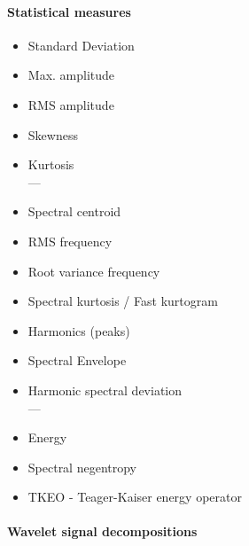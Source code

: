 \cite{jung_vibration_2017}

\paragraph{Statistical measures}
\begin{itemize}
\item Standard Deviation
\item Max. amplitude
\item RMS amplitude
\item Skewness
\item Kurtosis \\
---
\item Spectral centroid
\item RMS frequency
\item Root variance frequency
\item Spectral kurtosis / Fast kurtogram
\item Harmonics (peaks)
	\cite{bishop_multi-scale_2018}
	\cite{adikaram_non-parametric_2016}
	\cite{gerber_identification_2013}
	\cite{nunes_evaluation_2007}
\item Spectral Envelope
\item Harmonic spectral deviation \\
---
\item Energy
\item Spectral negentropy
	\cite{avoci_spectral_2020}
\item TKEO - Teager-Kaiser energy operator
	\cite{shi_application_2022}
\end{itemize}

\paragraph{Wavelet signal decompositions}


